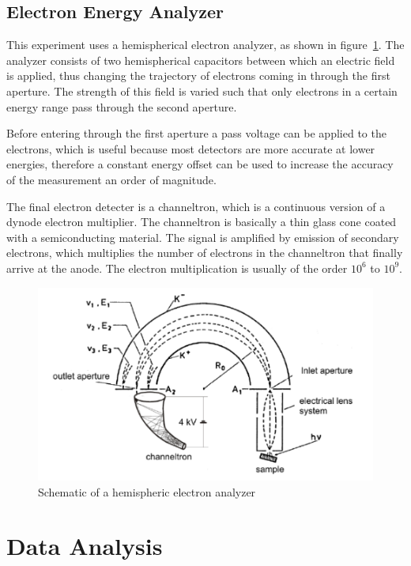 \documentclass[a4paper,10pt]{scrartcl}
\begin{document}
\subsection{Electron Energy Analyzer}

This experiment uses a hemispherical electron analyzer, as shown in figure~\ref{fig:analyzer}. The analyzer consists of two hemispherical capacitors between which an electric field is applied, thus changing the trajectory of electrons coming in through the first aperture. The strength of this field is varied such that only electrons in a certain energy range pass through the second aperture.

Before entering through the first aperture a pass voltage can be applied to the electrons, which is useful because most detectors are more accurate at lower energies, therefore a constant energy offset can be used to increase the accuracy of the measurement an order of magnitude.

The final electron detecter is a channeltron, which is a  continuous version of a dynode electron multiplier. The channeltron is basically a thin glass cone coated with a semiconducting material. The signal is amplified by emission of secondary electrons, which multiplies the number of electrons in the channeltron that finally arrive at the anode. The electron multiplication is usually of the order $10^6$ to $10^9$.

\begin{figure}
\centering
\includegraphics[scale=0.4]{img/analyzer}
\caption{Schematic of a hemispheric electron analyzer \label{fig:analyzer}}
\end{figure}

\section{Data Analysis}
\end{document}
